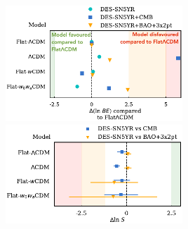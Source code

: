 \documentclass[aspectratio=169]{beamer}
\begin{document}
\begin{frame}
\begin{columns}
        \includegraphics[width=0.5\textwidth]{figures/des_model_comparison.pdf}%
        \includegraphics[width=0.5\textwidth]{figures/des_suspiciousness.pdf}
    \end{columns}
\end{frame}
\end{document}

